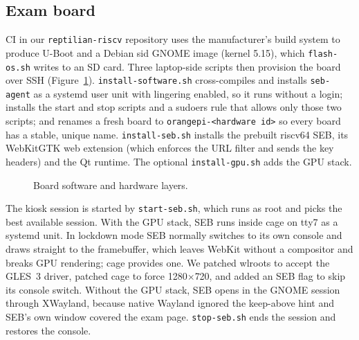 \documentclass[11pt]{article}
\begin{document}
\subsection{Exam board}
CI in our \texttt{reptilian-riscv} repository uses the manufacturer's build system to produce U-Boot and a Debian sid GNOME image (kernel 5.15), which \texttt{flash-os.sh} writes to an SD card. Three laptop-side scripts then provision the board over SSH (Figure~\ref{fig:stack}). \texttt{install-software.sh} cross-compiles and installs \texttt{seb-agent} as a systemd user unit with lingering enabled, so it runs without a login; installs the start and stop scripts and a sudoers rule that allows only those two scripts; and renames a fresh board to \texttt{orangepi-<hardware id>} so every board has a stable, unique name. \texttt{install-seb.sh} installs the prebuilt riscv64 SEB, its WebKitGTK web extension (which enforces the URL filter and sends the key headers) and the Qt runtime. The optional \texttt{install-gpu.sh} adds the GPU stack.

\begin{figure}[H]
\centering
{}
\caption{Board software and hardware layers.}
\label{fig:stack}
\end{figure}

The kiosk session is started by \texttt{start-seb.sh}, which runs as root and picks the best available session. With the GPU stack, SEB runs inside cage on tty7 as a systemd unit. In lockdown mode SEB normally switches to its own console and draws straight to the framebuffer, which leaves WebKit without a compositor and breaks GPU rendering; cage provides one. We patched wlroots to accept the GLES~3 driver, patched cage to force 1280$\times$720, and added an SEB flag to skip its console switch. Without the GPU stack, SEB opens in the GNOME session through XWayland, because native Wayland ignored the keep-above hint and SEB's own window covered the exam page. \texttt{stop-seb.sh} ends the session and restores the console.
\end{document}
